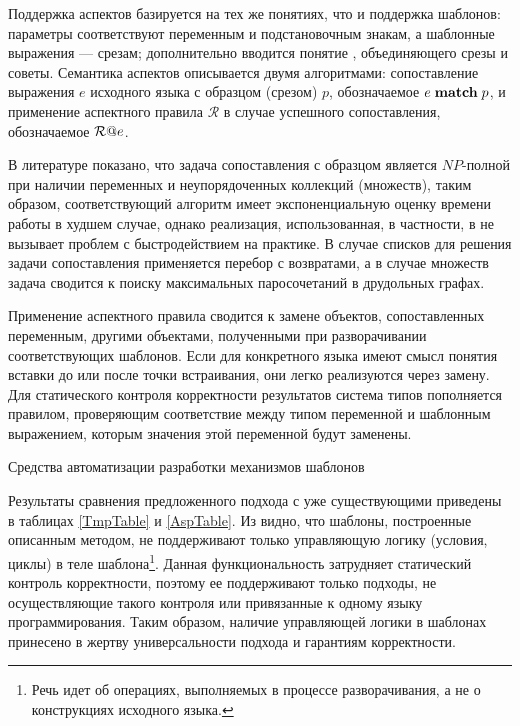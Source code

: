 Поддержка аспектов базируется на тех же понятиях, что и поддержка шаблонов: параметры соответствуют переменным и подстановочным знакам, а шаблонные выражения --- срезам; дополнительно вводится понятие , объединяющего срезы и советы. Семантика аспектов описывается двумя алгоритмами: сопоставление выражения $e$ исходного языка с образцом (срезом) $p$, обозначаемое $e \; \mathbf{match} \; p$, и применение аспектного правила $\mathcal{R}$ в случае успешного сопоставления, обозначаемое $\mathcal{R}@e$.

В литературе показано, что задача сопоставления с образцом является $NP$-полной при наличии переменных и неупорядоченных коллекций (множеств), таким образом, соответствующий алгоритм имеет экспоненциальную оценку времени работы в худшем случае, однако реализация, использованная, в частности, в \GRM{} не вызывает проблем с быстродействием на практике. В случае списков для решения задачи сопоставления применяется перебор с возвратами, а в случае множеств задача сводится к поиску максимальных паросочетаний в друдольных графах. 

Применение аспектного правила сводится к замене объектов, сопоставленных переменным, другими объектами, полученными при разворачивании соответствующих шаблонов. Если для конкретного языка имеют смысл понятия вставки до или после точки встраивания, они легко реализуются через замену.
Для статического контроля корректности результатов система типов пополняется правилом, проверяющим соответствие между типом переменной и шаблонным выражением, которым значения этой переменной будут заменены.

\begin{table}[htb]
	\centering
\newcommand{\dissonly}[1]{}

	\caption{Средства автоматизации разработки механизмов шаблонов}\label{TmpTable}
\end{table}

Результаты сравнения предложенного подхода с уже существующими приведены в таблицах \ref{TmpTable} и \ref{AspTable}. 
Из  видно, что шаблоны, построенные описанным методом, не поддерживают только управляющую логику (условия, циклы) в теле шаблона\footnote{Речь идет об операциях, выполняемых в процессе разворачивания, а не о конструкциях исходного языка.}. Данная функциональность затрудняет статический контроль корректности, поэтому ее поддерживают только подходы, не осуществляющие такого контроля или привязанные к одному языку программирования. Таким образом, наличие управляющей логики в шаблонах принесено в жертву универсальности подхода и гарантиям корректности. 


